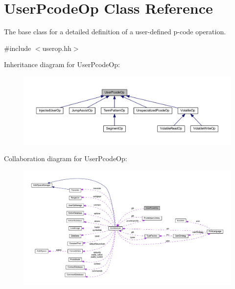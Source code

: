\hypertarget{class_user_pcode_op}{}\section{User\+Pcode\+Op Class Reference}
\label{class_user_pcode_op}


The base class for a detailed definition of a user-\/defined p-\/code operation.  




{\ttfamily \#include $<$userop.\+hh$>$}



Inheritance diagram for User\+Pcode\+Op\+:
\nopagebreak
\begin{figure}[H]
\begin{center}
\leavevmode
\includegraphics[width=350pt]{class_user_pcode_op__inherit__graph}
\end{center}
\end{figure}


Collaboration diagram for User\+Pcode\+Op\+:
\nopagebreak
\begin{figure}[H]
\begin{center}
\leavevmode
\includegraphics[width=350pt]{class_user_pcode_op__coll__graph}
\end{center}
\end{figure}
